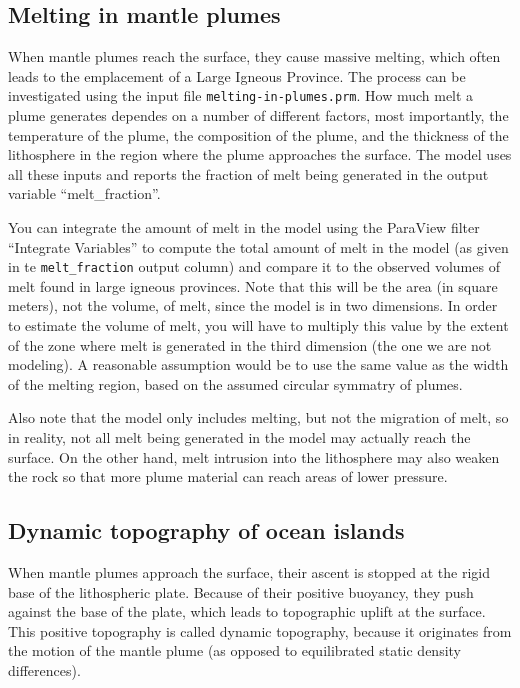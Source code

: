 \documentclass[notitlepage]{article}
\begin{document}
\subsection{Melting in mantle plumes}

When mantle plumes reach the surface, they cause massive melting, which often leads to the emplacement of a Large Igneous Province. The process can be investigated using the input file \texttt{melting-in-plumes.prm}.
How much melt a plume generates dependes on a number of different factors, most importantly, the temperature of the plume, the composition of the plume, and the thickness of the lithosphere in the region where the plume approaches the surface. The model uses all these inputs and reports the fraction of melt being generated in the output variable ``melt\_fraction''.

You can integrate the amount of melt in the model using the ParaView filter ``Integrate Variables'' to compute the total amount of melt in the model (as given in te \texttt{melt\_fraction} output column) and compare it to the observed volumes of melt found in large igneous provinces. Note that this will be the area (in square meters), not the volume, of melt, since the model is in two dimensions. 
In order to estimate the volume of melt, you will have to multiply this value by the extent of the zone where melt is generated in the third dimension (the one we are not modeling). A reasonable assumption would be to use the same value as the width of the melting region, based on the assumed circular symmatry of plumes. 

Also note that the model only includes melting, but not the migration of melt, so in reality, not all melt being generated in the model may actually reach the surface. On the other hand, melt intrusion into the lithosphere may also weaken the rock so that more plume material can reach areas of lower pressure. 

\subsection{Dynamic topography of ocean islands}

When mantle plumes approach the surface, their ascent is stopped at the rigid base of the lithospheric plate. 
Because of their positive buoyancy, they push against the base of the plate, which leads to topographic uplift
at the surface. This positive topography is called dynamic topography, because it originates from the motion of 
the mantle plume (as opposed to equilibrated static density differences). 
\end{document}
